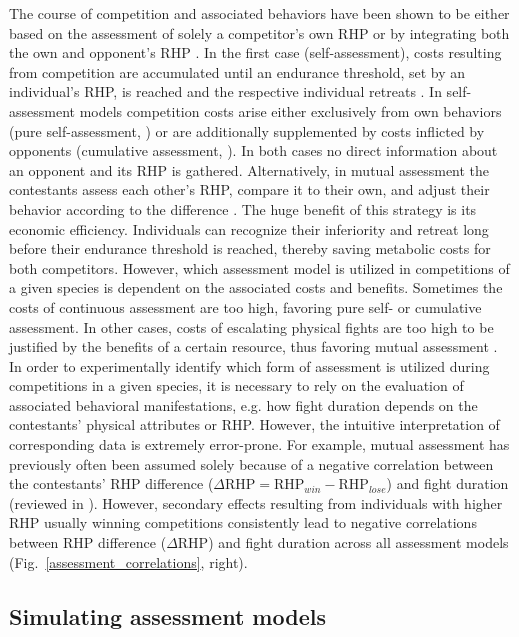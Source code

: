 \documentclass[11pt,pdftex]{article}
\newcommand{\fref}[1]{\textup{\ref{#1}}}
\newcommand{\fig}{Fig.}
\newcommand{\figref}[1]{\fig~\fref{#1}}
\begin{document}
The course of competition and associated behaviors have been shown to be either based on the assessment of solely a competitor's own RHP or by integrating both the own and opponent's RHP \citep{Enquist1990, Taylor2001, Huyghe2005}. In the first case (self-assessment), costs resulting from competition are accumulated until an endurance threshold, set by an individual's RHP, is reached and the respective individual retreats \citep{ArnottElwood2009}. In self-assessment models competition costs arise either exclusively from own behaviors (pure self-assessment, \citealp{Taylor2003}) or are additionally supplemented by costs inflicted by opponents (cumulative assessment, \citealp{Payne1998}). In both cases no direct information about an opponent and its RHP is gathered. Alternatively, in mutual assessment the contestants assess each other's RHP, compare it to their own, and adjust their behavior according to the difference \citep{EnquistLeimar1987}. The huge benefit of this strategy is its economic efficiency. Individuals can recognize their inferiority and retreat long before their endurance threshold is reached, thereby saving metabolic costs for both competitors. However, which assessment model is utilized in competitions of a given species is dependent on the associated costs and benefits. Sometimes the costs of continuous assessment are too high, favoring pure self- or cumulative assessment. In other cases, costs of escalating physical fights are too high to be justified by the benefits of a certain resource, thus favoring mutual assessment \citep{ArnottElwood2009}. In order to experimentally identify which form of assessment is utilized during competitions in a given species, it is necessary to rely on the evaluation of associated behavioral manifestations, e.g. how fight duration depends on the contestants' physical attributes or RHP. However, the intuitive interpretation of corresponding data is extremely error-prone. For example, mutual assessment has previously often been assumed solely because of a negative correlation between the contestants' RHP difference ($\Delta \text{RHP} = \text{RHP}_{win} - \text{RHP}_{lose}$) and fight duration (reviewed in \citealp{ArnottElwood2009}). However, secondary effects resulting from individuals with higher RHP usually winning competitions consistently lead to negative correlations between RHP difference ($\Delta$RHP) and fight duration across all assessment models (\figref{assessment_correlations}, right).  

\subsection{Simulating assessment models}
\end{document}
